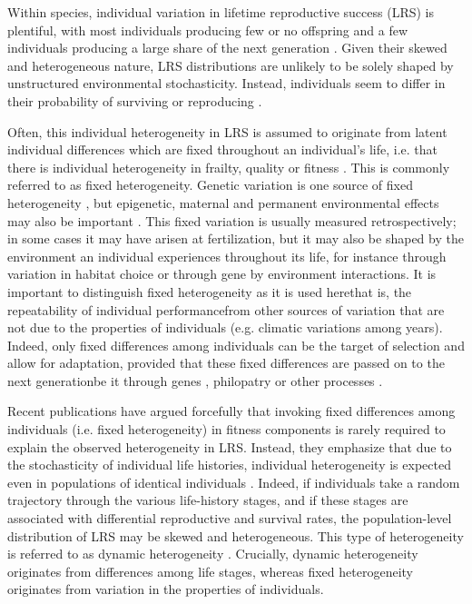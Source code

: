 Within species, individual variation in lifetime reproductive success (LRS) is plentiful, with most individuals producing few or no offspring and a few individuals producing a large share of the next generation \parencite{Clutton1988,Stearns1992}. Given their skewed and heterogeneous nature, LRS distributions are unlikely to be solely shaped by unstructured environmental stochasticity. Instead, individuals seem to differ in their probability of surviving or reproducing \parencite{Kendall2011}.

Often, this individual heterogeneity in LRS is assumed to originate from latent individual differences which are fixed throughout an individual's life, i.e. that there is individual heterogeneity in frailty, quality or fitness \parencite[e.g.][]{Vaupel1979,Morris1998, Cam2000}. This is commonly referred to as fixed heterogeneity. Genetic variation is one source of fixed heterogeneity \parencite[e.g.][]{Keller2002,Ellegren2008}, but epigenetic, maternal and permanent environmental effects may also be important \parencite{Wolf2009,Turner2009}. This fixed variation is usually measured retrospectively; in some cases it may have arisen at fertilization, but it may also be shaped by the environment an individual experiences throughout its life, for instance through variation in habitat choice or through gene by environment interactions. It is important to distinguish fixed heterogeneity as it is used here\textemdash that is, the repeatability of individual performance\textemdash from other sources of variation that are not due to the properties of individuals (e.g. climatic variations among years). Indeed, only fixed differences among individuals can be the target of selection and allow for adaptation, provided that these fixed differences are passed on to the next generation\textemdash be it through genes \parencite{Keller2002}, philopatry \parencite{Schauber2011} or other processes \parencite{Bonduriansky2012}. 

Recent publications \parencite{Tuljapurkar2009,Steiner2010,Orzack2011,Steiner2012} have argued forcefully that invoking fixed differences among individuals (i.e. fixed heterogeneity) in fitness components is rarely required to explain the observed heterogeneity in LRS. Instead, they emphasize that due to the stochasticity of individual life histories, individual heterogeneity is expected even in populations of identical individuals \parencite{Caswell2011}. Indeed, if individuals take a random trajectory through the various life-history stages, and if these stages are associated with differential reproductive and survival rates, the population-level distribution of LRS may be skewed and heterogeneous. This type of heterogeneity is referred to as dynamic heterogeneity \parencite{Tuljapurkar2009}. Crucially, dynamic heterogeneity originates from differences among life stages, whereas fixed heterogeneity originates from variation in the properties of individuals.

